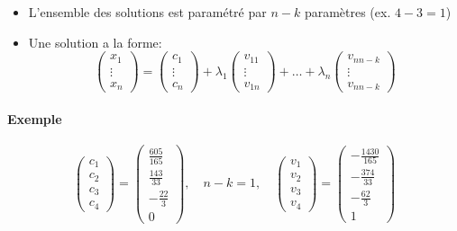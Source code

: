 \documentclass[
    11pt,
    a4paper,
    oneside,
    headinlcude, footinclude,
    twoside,
]{report}
\begin{document}
\begin{itemize}
    \item L'ensemble des solutions est paramétré par $n-k$ paramètres (ex. $4-3=1$)
    \item Une solution a la forme:
        \[
            \left(\begin{array}{c}x_{1} \\\vdots \\x_{n}\end{array}\right) =
            \left(\begin{array}{c}c_{1} \\\vdots \\c_{n}\end{array}\right) + 
            \lambda_{1} \left(\begin{array}{c}v_{11} \\\vdots \\v_{1n}\end{array}\right) + \ldots + 
            \lambda_{n} \left(\begin{array}{c}v_{n n-k} \\\vdots \\v_{n n-k}\end{array}\right)
        \]
\end{itemize}

\paragraph{Exemple}
\label{par:exemple}

\[
    \left(\begin{array}{c}c_{1} \\c_{2} \\c_{3} \\c_{4}\end{array}\right) = 
    \left(\begin{array}{c}\frac{605}{165} \\\frac{143}{33} \\-\frac{22}{3} \\0\end{array}\right),
    \quad n - k = 1, \quad 
    \left(\begin{array}{c}v_{1} \\v_{2} \\v_{3} \\v_{4}\end{array}\right) = 
    \left(\begin{array}{c}-\frac{1430}{165} \\-\frac{374}{33} \\-\frac{62}{3} \\1\end{array}\right)
\]
\end{document}
